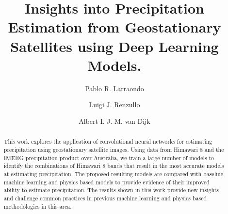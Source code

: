 \documentclass[3p,times]{elsarticle}
\begin{document}
\begin{frontmatter}



\dochead{}

\title{Insights into Precipitation Estimation from Geostationary Satellites using Deep Learning Models.}


\author[1]{Pablo R. Larraondo}
\author[1]{Luigi J. Renzullo}
\author[1]{Albert I. J. M. van Dijk}

\address[1]{Fenner School of Environment and Society. Australian National University. Canberra, Australia}

\begin{abstract}
This work explores the application of convolutional neural networks for estimating precipitation using geostationary satellite images. Using data from Himawari 8 and the IMERG precipitation product over Australia, we train a large number of models to identify the combinations of Himawari 8 bands that result in the most accurate models at estimating precipitation. The proposed resulting models are compared with baseline machine learning and physics based models to provide evidence of their improved ability to estimate precipitation. The results shown in this work provide new insights and challenge common practices in previous machine learning and physics based methodologies in this area.
\end{abstract}

\begin{keyword}


\end{keyword}

\end{frontmatter}
\end{document}
